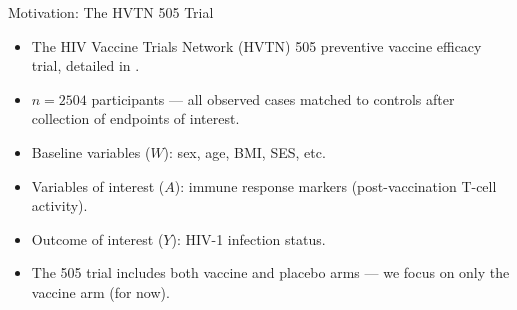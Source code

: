 \documentclass{beamer}
\begin{document}
\begin{frame}[c]{Motivation: The HVTN 505 Trial}

\begin{center}
\begin{itemize}
  \itemsep10pt
  \item The HIV Vaccine Trials Network (HVTN) 505 preventive vaccine efficacy
    trial, detailed in \cite{hammer2013efficacy}.
  \item $n = 2504$ participants --- all observed cases matched to controls after
    collection of endpoints of interest.
  \item Baseline variables ($W$): sex, age, BMI, SES, etc.
  \item Variables of interest ($A$): immune response markers (post-vaccination
    T-cell activity).
  \item Outcome of interest ($Y$): HIV-1 infection status.
  \item The 505 trial includes both vaccine and placebo arms --- we focus on
    only the vaccine arm (for now).
\end{itemize}
\end{center}


\end{frame}

\end{document}
